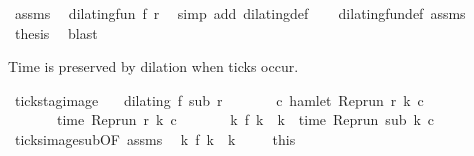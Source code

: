 \begin{isabellebody}
\ assms{\isacharparenleft}{}{\isacharparenright}\ \isamarkupfalse%
\ {\isacartoucheopen}dilating{\isacharunderscore}fun\ f\ r{\isacartoucheclose}\ \isamarkupfalse%
\ {\isacharparenleft}simp\ add{\isacharcolon}\ dilating{\isacharunderscore}def{\isacharparenright}\isanewline
\ \ \isamarkupfalse%
\ dilating{\isacharunderscore}fun{\isacharunderscore}def\ assms{\isacharparenleft}{}{\isacharparenright}\ \isamarkupfalse%
\ {\isacharquery}thesis\ \isamarkupfalse%
\ blast\isanewline
{}\isamarkupfalse%
%
\endisatagproof
{\isafoldproof}%
%
\isadelimproof
%
\endisadelimproof
%
\begin{isamarkuptext}%
Time is preserved by dilation when ticks occur.%
\end{isamarkuptext}\isamarkuptrue%
\isamarkupfalse%
\ ticks{\isacharunderscore}tag{\isacharunderscore}image{\isacharcolon}\isanewline
\ \ \ {\isacartoucheopen}dilating\ f\ sub\ r{\isacartoucheclose}\isanewline
\ \ \ \ \ \ \ {\isacartoucheopen}{\isasymexists}c{\isachardot}\ hamlet\ {\isacharparenleft}{\isacharparenleft}Rep{\isacharunderscore}run\ r{\isacharparenright}\ k\ c{\isacharparenright}{\isacartoucheclose}\isanewline
\ \ \ \ \ \ \ {\isacartoucheopen}time\ {\isacharparenleft}{\isacharparenleft}Rep{\isacharunderscore}run\ r{\isacharparenright}\ k\ c{\isacharparenright}\ {\isacharequal}\ {\isasymtau}{\isacartoucheclose}\isanewline
\ \ \ \ \ {\isacartoucheopen}{\isasymexists}k\ f\ k\ {\isacharequal}\ k\ {\isasymand}\ time\ {\isacharparenleft}{\isacharparenleft}Rep{\isacharunderscore}run\ sub{\isacharparenright}\ k\ c{\isacharparenright}\ {\isacharequal}\ {\isasymtau}{\isacartoucheclose}\isanewline
%
\isadelimproof
%
\endisadelimproof
%
\isatagproof
{}\isamarkupfalse%
\ {\isacharminus}\isanewline
\ \ \isamarkupfalse%
\ ticks{\isacharunderscore}image{\isacharunderscore}sub{\isacharprime}{\isacharbrackleft}OF\ assms{\isacharparenleft}{}{\isacharcomma}{}{\isacharparenright}{\isacharbrackright}\ \isamarkupfalse%
\ {\isacartoucheopen}{\isasymexists}k\ f\ k\ {\isacharequal}\ k{\isacartoucheclose}\ \isacommand{{\isachardot}}\isamarkupfalse%
\isanewline
\ \ \isamarkupfalse%
\ this\ \isamarkupfalse%

\end{isabellebody}
